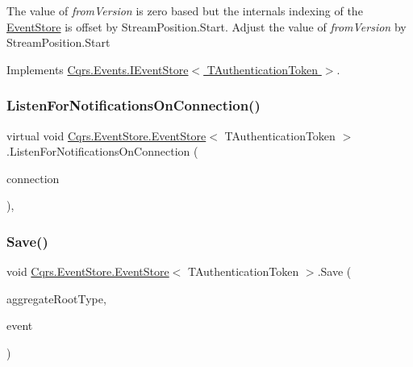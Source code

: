 The value of {\itshape from\+Version}  is zero based but the internals indexing of the \hyperlink{classCqrs_1_1EventStore_1_1EventStore}{Event\+Store} is offset by Stream\+Position.\+Start. Adjust the value of {\itshape from\+Version}  by Stream\+Position.\+Start 

Implements \hyperlink{interfaceCqrs_1_1Events_1_1IEventStore_add6227e2978ff8656aad79b1a51bf34c}{Cqrs.\+Events.\+I\+Event\+Store$<$ T\+Authentication\+Token $>$}.

\mbox{\label{classCqrs_1_1EventStore_1_1EventStore_add7396a800fe8f64c61406311e8fee1d}} 
\subsubsection{\texorpdfstring{Listen\+For\+Notifications\+On\+Connection()}{ListenForNotificationsOnConnection()}}
{\footnotesize\ttfamily virtual void \hyperlink{classCqrs_1_1EventStore_1_1EventStore}{Cqrs.\+Event\+Store.\+Event\+Store}$<$ T\+Authentication\+Token $>$.Listen\+For\+Notifications\+On\+Connection (\begin{DoxyParamCaption}\item[{I\+Event\+Store\+Connection}]{connection }\end{DoxyParamCaption})\hspace{0.3cm}{\ttfamily [protected]}, {\ttfamily [virtual]}}

\mbox{\label{classCqrs_1_1EventStore_1_1EventStore_adce33037e2a3eb81cfccded42ba2ed35}} 
\subsubsection{\texorpdfstring{Save()}{Save()}}
{\footnotesize\ttfamily void \hyperlink{classCqrs_1_1EventStore_1_1EventStore}{Cqrs.\+Event\+Store.\+Event\+Store}$<$ T\+Authentication\+Token $>$.Save (\begin{DoxyParamCaption}\item[{Type}]{aggregate\+Root\+Type,  }\item[{\hyperlink{interfaceCqrs_1_1Events_1_1IEvent}{I\+Event}$<$ T\+Authentication\+Token $>$ @}]{event }\end{DoxyParamCaption})}



